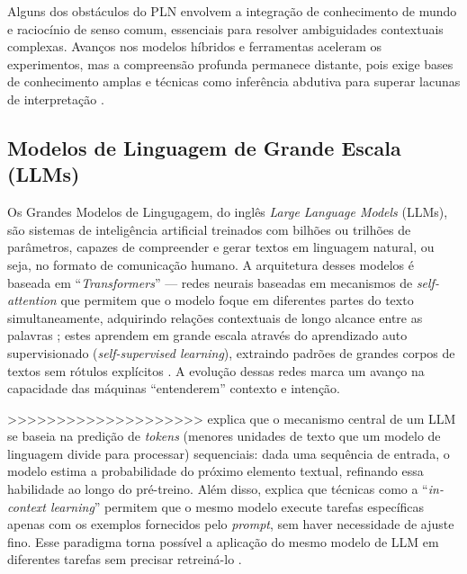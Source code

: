 Alguns dos obstáculos do PLN envolvem a integração de conhecimento de mundo e raciocínio de senso comum, essenciais para resolver ambiguidades contextuais complexas.
Avanços nos modelos híbridos e ferramentas aceleram os experimentos, mas a compreensão profunda permanece distante, pois exige bases de conhecimento amplas e técnicas como inferência abdutiva para superar lacunas de interpretação \cite{Chowdhary2020}. 


\subsection{Modelos de Linguagem de Grande Escala (LLMs)}

Os Grandes Modelos de Lingugagem, do inglês \textit{Large Language Models} (LLMs),
são sistemas de inteligência artificial treinados com bilhões ou trilhões de parâmetros,
capazes de compreender e gerar textos em linguagem natural, ou seja, no formato de comunicação humano.
A arquitetura desses modelos é baseada em ``\textit{Transformers}'' --- redes neurais baseadas em mecanismos de \textit{self-attention} 
que permitem que o modelo foque em diferentes partes do texto simultaneamente, adquirindo relações contextuais de longo alcance entre as palavras \cite{weber2024redpajamaopendatasettraining};  
estes aprendem em grande escala através do aprendizado auto supervisionado (\textit{self-supervised learning}), extraindo padrões de grandes corpos de textos sem rótulos explícitos \cite{hasanov2024application}.
A evolução dessas redes marca um avanço na capacidade das máquinas ``entenderem'' contexto e intenção.

>>>>>>>>>>>>>>>>>>>> explica que o mecanismo central de um LLM se baseia na predição de \textit{tokens} (menores unidades de texto que um modelo de linguagem divide para processar) sequenciais: 
dada uma sequência de entrada, o modelo estima a probabilidade do próximo elemento textual, refinando essa habilidade ao longo do pré-treino.
Além disso, explica que técnicas como a ``\textit{in-context learning}'' permitem que o mesmo modelo execute tarefas específicas apenas com os exemplos fornecidos pelo \textit{prompt}, sem haver necessidade de ajuste fino. 
Esse paradigma torna possível a aplicação do mesmo modelo de LLM em diferentes tarefas sem precisar retreiná-lo \cite{motlagh2024llmcyber}.

